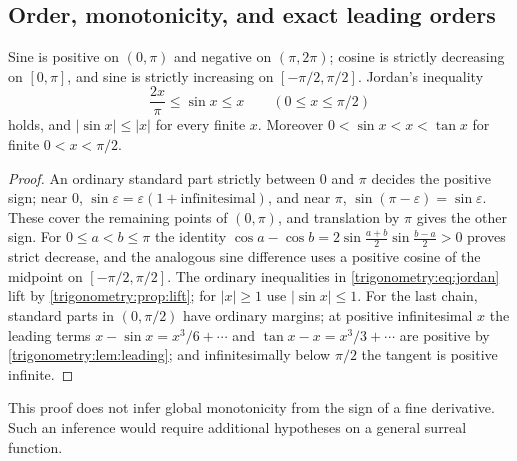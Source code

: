 \documentclass[11pt,letterpaper]{article}
\numberwithin{equation}{section}
\theoremstyle{definition}
\theoremstyle{remark}
\newcommand{\eps}{\varepsilon}
\begin{document}
\subsection{Order, monotonicity, and exact leading orders}
\begin{proposition}\label{trigonometry:prop:order}
Sine is positive on $(0,\pi)$ and negative on $(\pi,2\pi)$; cosine is strictly decreasing on
$[0,\pi]$, and sine is strictly increasing on $[-\pi/2,\pi/2]$. Jordan's inequality
\begin{equation}\label{trigonometry:eq:jordan}
 \frac{2x}\pi\le\sin x\le x\qquad(0\le x\le\pi/2)
\end{equation}
holds, and $|\sin x|\le|x|$ for every finite $x$. Moreover $0<\sin x<x<\tan x$ for finite
$0<x<\pi/2$.
\end{proposition}
\begin{proof}
An ordinary standard part strictly between $0$ and $\pi$ decides the positive sign; near $0$,
$\sin\eps=\eps(1+\text{infinitesimal})$, and near $\pi$, $\sin(\pi-\eps)=\sin\eps$. These cover
the remaining points of $(0,\pi)$, and translation by $\pi$ gives the other sign. For
$0\le a<b\le\pi$ the identity $\cos a-\cos b=2\sin\frac{a+b}2\sin\frac{b-a}2>0$ proves strict
decrease, and the analogous sine difference uses a positive cosine of the midpoint on
$[-\pi/2,\pi/2]$. The ordinary inequalities in \cref{trigonometry:eq:jordan} lift by
\cref{trigonometry:prop:lift}; for $|x|\ge1$ use $|\sin x|\le1$. For the last chain, standard parts
in $(0,\pi/2)$ have ordinary margins; at positive infinitesimal $x$ the leading terms
$x-\sin x=x^3/6+\cdots$ and $\tan x-x=x^3/3+\cdots$ are positive by
\cref{trigonometry:lem:leading}; and infinitesimally below $\pi/2$ the tangent is positive
infinite.
\end{proof}
This proof does not infer global monotonicity from the sign of a fine derivative. Such an inference
would require additional hypotheses on a general surreal function.
\end{document}
